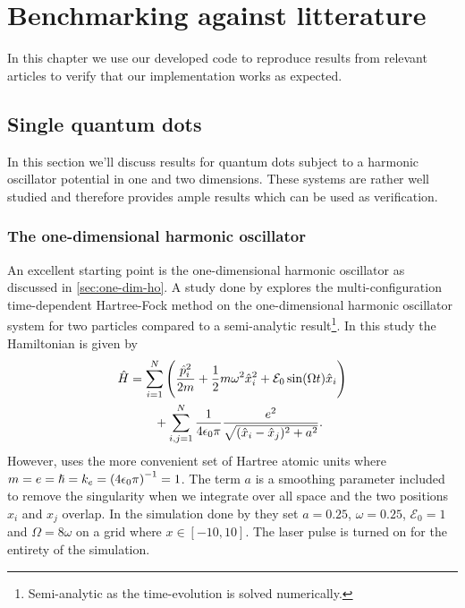 \chapter{Benchmarking against litterature}
    In this chapter we use our developed code to reproduce results from relevant
    articles to verify that our implementation works as expected.

    \section{Single quantum dots}
        In this section we'll discuss results for quantum dots subject to a
        harmonic oscillator potential in one and two dimensions.
        These systems are rather well studied and therefore provides ample
        results which can be used as verification.

        \subsection{The one-dimensional harmonic oscillator}
            An excellent starting point is the one-dimensional harmonic
            oscillator as discussed in \autoref{sec:one-dim-ho}.
            A study done by \citeauthor{zanghellini_2004}
            \cite{zanghellini_2004, skattum2013time, kristiansen2017time}
            explores the multi-configuration time-dependent Hartree-Fock method
            on the one-dimensional harmonic oscillator system for two particles
            compared to a semi-analytic result\footnote{Semi-analytic as the
            time-evolution is solved numerically.}.
            In this study the Hamiltonian is given by
            \begin{align}
                \hat{H}
                &=
                \sum_{i = 1}^{N}
                \left( 
                    \frac{\hat{p}^2_i}{2m}
                    + \frac{1}{2} m \omega^2 \hat{x}^2_i
                    + \mathcal{E}_0 \sin(\Omega t)\hat{x}_i
                 \right)
                \nonumber \\
                &\qquad
                + \sum_{i, j = 1}^{N}
                \frac{1}{4\epsilon_0\pi}
                \frac{e^2}{\sqrt{(\hat{x}_i - \hat{x}_j)^2 + a^2}}.
            \end{align}
            However, \citeauthor{zanghellini_2004} uses the more convenient set
            of Hartree atomic units where $m = e = \hslash = k_e =
            \left( 4\epsilon_0\pi \right)^{-1} = 1$.
            The term $a$ is a smoothing parameter included to remove the
            singularity when we integrate over all space and the two positions
            $x_i$ and $x_j$ overlap. \cite{suq, zanghellini_2004}
            In the simulation done by \citeauthor{zanghellini_2004} they set $a
            = 0.25$, $\omega = 0.25$, $\mathcal{E}_0 = 1$ and $\Omega = 8\omega$
            on a grid where $x \in [-10, 10]$.
            The laser pulse is turned on for the entirety of the simulation.

